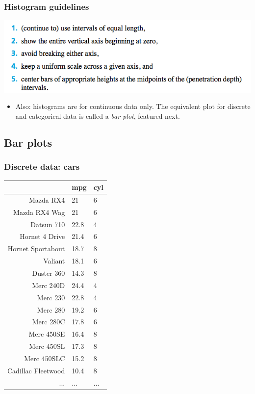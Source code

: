 \documentclass[handout]{beamer}
\numberwithin{equation}{section}
\begin{document}
\begin{frame}
\frametitle{Histogram guidelines}
 \includegraphics{../../fig/histrules.png}
\begin{itemize}
\pause \item Also: histograms are for continuous data only. The equivalent plot for discrete and categorical data is called a \emph{bar plot}, featured next. 
\end{itemize}
\end{frame}

\subsection{Bar plots}

\begin{frame}
\frametitle{Discrete data: cars} \scriptsize
\begin{table}[ht]
\centering
\begin{tabular}{rll}
  \hline
 & mpg & cyl \\ 
  \hline
Mazda RX4 & 21 & 6 \\ 
  Mazda RX4 Wag & 21 & 6 \\ 
  Datsun 710 & 22.8 & 4 \\ 
  Hornet 4 Drive & 21.4 & 6 \\ 
  Hornet Sportabout & 18.7 & 8 \\ 
  Valiant & 18.1 & 6 \\ 
  Duster 360 & 14.3 & 8 \\ 
  Merc 240D & 24.4 & 4 \\ 
  Merc 230 & 22.8 & 4 \\ 
  Merc 280 & 19.2 & 6 \\ 
  Merc 280C & 17.8 & 6 \\ 
  Merc 450SE & 16.4 & 8 \\ 
  Merc 450SL & 17.3 & 8 \\ 
  Merc 450SLC & 15.2 & 8 \\ 
  Cadillac Fleetwood & 10.4 & 8 \\ 
  ... & ... & ... \\ 
   \hline
\end{tabular}
\end{table}\end{frame}
\end{document}
